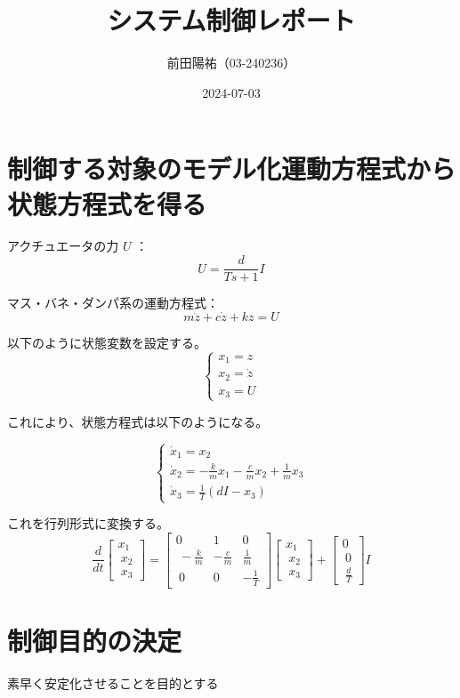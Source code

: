 \documentclass{jsarticle}
\begin{document}
\title{システム制御レポート}
\author{前田陽祐（03-240236）}
\date{2024-07-03}
\maketitle

\section{制御する対象のモデル化運動方程式から状態方程式を得る}
アクチュエータの力 \( U \) ：
\[ U = \frac{d}{Ts + 1}I \]

マス・バネ・ダンパ系の運動方程式：
\[ m\ddot{z} + c\dot{z} + kz = U \]

以下のように状態変数を設定する。
\[ \begin{cases}
     {x}_1 = z \\
     {x}_2 = \dot{z} \\
     {x}_3 = U
\end{cases} \]

これにより、状態方程式は以下のようになる。

\[ \begin{cases}
\dot{x}_1 = x_2 \\
\dot{x}_2 = -\frac{k}{m}x_1 - \frac{c}{m}x_2 + \frac{1}{m}x_3 \\
\dot{x}_3 = \frac{1}{T}(dI - x_3)
\end{cases} \]

これを行列形式に変換する。
\[
\frac{d}{dt} \begin{bmatrix}
 x_1 \\\ x_2 \\\ x_3
\end{bmatrix}= \begin{bmatrix}
0 & 1 & 0 \\\ -\frac{k}{m} & -\frac{c}{m} & \frac{1}{m} \\\ 0 & 0 & -\frac{1}{T} \end{bmatrix}
\begin{bmatrix} x_1 \\\ x_2 \\\ x_3 \end{bmatrix}
+
\begin{bmatrix} 0 \\\ 0 \\\ \frac{d}{T} \end{bmatrix} I
\]

\section{制御目的の決定}
素早く安定化させることを目的とする
\end{document}
